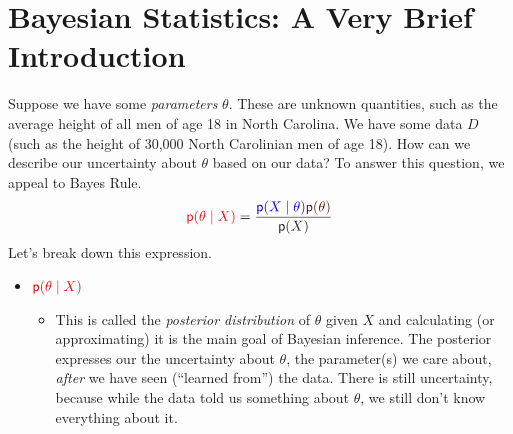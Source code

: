 \documentclass[twoside]{article}
\def\p{\textsf{p}} %
\begin{document}
\section{Bayesian Statistics: A Very Brief Introduction} 
Suppose we have some \emph{parameters} $\theta$. These are unknown quantities, such as the average height of all men of age 18 in North Carolina. 
We have some data $D$ (such as the height of 30,000 North Carolinian men of age 18). How can we describe our uncertainty about $\theta$ based 
on our data? To answer this question, we appeal to Bayes Rule. 
$$ {\color{red} \p(\theta \mid X ) } = \frac{ {\color{blue} \p(X \mid \theta )}{\color{Sepia} \p( \theta )} }{{\color{Black}\p(X)}} $$
Let's break down this expression. 
\begin{itemize}
 \item $\color{red} \p(\theta\mid X )$ 
 \begin{itemize}
 \item This is called the \emph{posterior distribution} of $\theta$ given $X$ and calculating (or approximating) it is the main goal of Bayesian inference. The posterior expresses our the uncertainty about $\theta$, the parameter(s) we care about, \textit{after} we have seen (``learned from'') the data. There is still uncertainty, because while the data told us something about $\theta$, we still don't know everything about it.
 \end{itemize}
 

\end{itemize}
\end{document}
